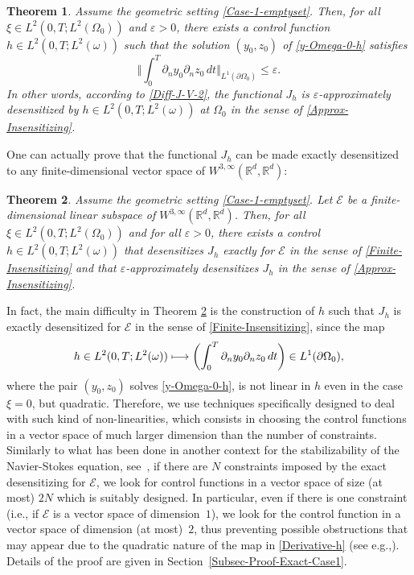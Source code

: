 \documentclass[11pt]{article}
\newcommand{\ie}{i.e.,\xspace}
\newcommand{\eg}{e.g.,\xspace}
\numberwithin{equation}{section}
\newcommand\mto{\mathchoice{\longmapsto}{\mapsto}{\mapsto}{\mapsto}}
\newcommand\R{{\mathbb R}}
\newcommand{\bbnorm}[1]{\biggl\Vert#1\biggr\Vert}
\newtheorem{theorem}{Theorem}[section]
\theoremstyle{definition}
\begin{document}
\begin{theorem}
\label{Thm-Approx-Case1}
Assume the geometric setting \eqref{Case-1-emptyset}. Then, for all $\xi \!\in\! L^2(0,T; L^2(\Omega_0))$ and $\varepsilon >0$, there exists a control function $h \in L^2(0,T; L^2(\omega))$ such that the solution $(y_0,z_0)$ of \eqref{y-Omega-0-h} satisfies
\begin{equation}
\label{Approx-Insensitzing-Equivalent}
\bbnorm{ \int_0^T \partial_n y_0 \partial_n z_0 \, dt}_{L^1(\partial \Omega_0)} \leq \varepsilon.
\end{equation}
In other words, according to \eqref{Diff-J-V-2}, the functional $J_h$ is $\varepsilon$-approximately desensitized by $h \in L^2(0,T; L^2(\omega))$ at $\Omega_0$ in the sense of \eqref{Approx-Insensitizing}.
\end{theorem}

One can actually prove that the functional $J_h$ can be made exactly desensitized to any finite-dimensional vector space of $W^{3, \infty}(\R^d, \R^d)$:

\begin{theorem}
\label{Thm-Case1-Exact-FD}
Assume the geometric setting \eqref{Case-1-emptyset}. Let $\mathcal{E}$ be a finite-dimensional linear subspace of $W^{3, \infty}(\R^d, \R^d)$. Then, for all $\xi \in L^2(0,T; L^2(\Omega_0))$ and for all $\varepsilon>0$, there exists a control $h\in L^2(0,T; L^2(\omega))$ that desensitizes $J_h$ exactly for $\mathcal{E}$ in the sense of \eqref{Finite-Insensitizing} and that $\varepsilon$-approximately desensitizes $J_h$ in the sense of \eqref{Approx-Insensitizing}.
\end{theorem}

In fact, the main difficulty in Theorem \ref{Thm-Case1-Exact-FD} is the construction of $h$ such that $J_h$ is exactly desensitized for $\mathcal{E}$ in the sense of \eqref{Finite-Insensitizing}, since the map
\begin{equation}
\label{Derivative-h}
h \in L^2(0,T; L^2(\omega)) \mto \biggl(\int_0^T \partial_n y_0 \partial_n z_0 \, dt\biggr) \in L^1(\partial \Omega_0),
\end{equation}
where the pair $(y_0,z_0)$ solves \eqref{y-Omega-0-h}, is not linear in $h$ even in the case $\xi = 0$, but quadratic. Therefore, we use techniques specifically designed to deal with such kind of non-linearities, which consists in choosing the control functions in a vector space of much larger dimension than the number of constraints. Similarly to what has been done in another context for the stabilizability of the Navier-Stokes equation, see~\cite{Chowdhury-Erv-2019}, if there are $N$ constraints imposed by the exact desensitizing for $\mathcal E$, we look for control functions in a vector space of size (at most) $2N$ which is suitably designed. In particular, even if there is one constraint (\ie if $\mathcal{E}$ is a vector space of dimen\-sion~$1$), we look for the control function in a vector space of dimension (at most)~$2$, thus preventing possible obstructions that may appear due to the quadratic nature of the map in \eqref{Derivative-h} (see \eg \cite{Beauchard-Marbach-2017}).
Details of the proof are given in Section~\ref{Subsec-Proof-Exact-Case1}.
\end{document}

